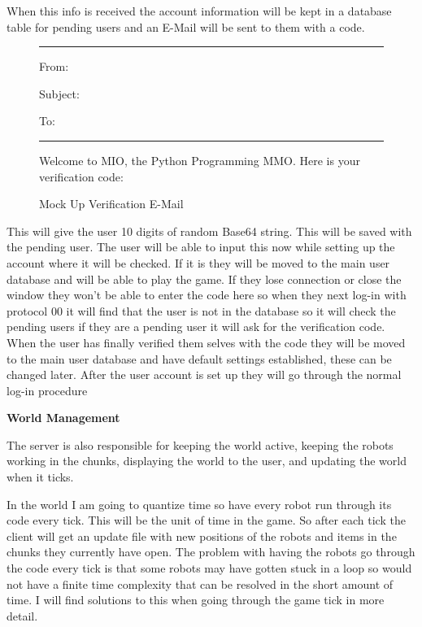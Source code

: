 \documentclass[12pt]{article}
\begin{document}
When this info is received the account information will be kept in a database table for pending users and an E-Mail will be sent to them with a code.
\begin{figure}
\begin{mdframed}
 \par
\noindent\rule{15cm}{0.4pt}
From:\par
{}\newline
Subject:\par
{} \par
To:\par
{}
\newline
\noindent\rule{15cm}{0.4pt}
\newline
Welcome to MIO, the Python Programming MMO. Here is your verification code:\newline
{}

\end{mdframed}
\caption{Mock Up Verification E-Mail}
\end{figure}

This will give the user 10 digits of random Base64 string. This will be saved with the pending user. The user will be able to input this now while setting up the account where it will be checked. If it is they will be moved to the main user database and will be able to play the game. If they lose connection or close the window they won't be able to enter the code here so when they next log-in with protocol 00 it will find that the user is not in the database so it will check the pending users if they are a pending user it will ask for the verification code. When the user has finally verified them selves with the code they will be moved to the main user database and have default settings established, these can be changed later. After the user account is set up they will go through the normal log-in procedure


\textbf{World Management}\newline

The server is also responsible for keeping the world active, keeping the robots working in the chunks, displaying the world to the user, and updating the world when it ticks.

In the world I am going to quantize time so have every robot run through its code every tick. This will be the unit of time in the game. So after each tick the client will get an update file with new positions of the robots and items in the chunks they currently have open. The problem with having the robots go through the code every tick is that some robots may have gotten stuck in a loop so would not have a finite time complexity that can be resolved in the short amount of time. I will find solutions to this when going through the game tick in more detail.
\end{document}
